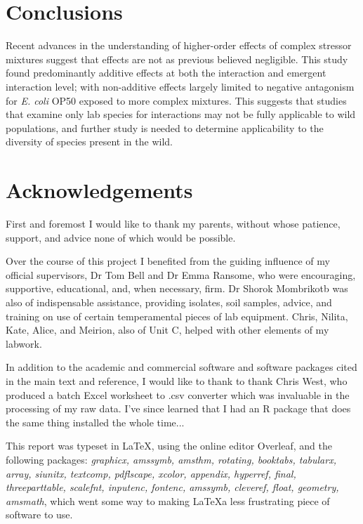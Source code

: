 \documentclass[final,1p,times]{elsarticle}
\begin{document}
\section{Conclusions}
\label{S:5}

Recent advances in the understanding of higher-order effects of complex stressor mixtures suggest that effects are not as previous believed negligible. This study found predominantly additive effects at both the interaction and emergent interaction level; with non-additive effects largely limited to negative antagonism for \textit{E. coli} OP50 exposed to more complex mixtures. This suggests that studies that examine only lab species for interactions may not be fully applicable to wild populations, and further study is needed to determine applicability to the diversity of species present in the wild.

\section{Acknowledgements}
\label{S:6}
First and foremost I would like to thank my parents, without whose patience, support, and advice none of which would be possible.

Over the course of this project I benefited from the guiding influence of my official supervisors, Dr Tom Bell and Dr Emma Ransome, who were encouraging, supportive, educational, and, when necessary, firm. Dr Shorok Mombrikotb was also of indispensable assistance, providing isolates, soil samples, advice, and training on use of certain temperamental pieces of lab equipment. Chris, Nilita, Kate, Alice, and Meirion, also of Unit C, helped with other elements of my labwork.

In addition to the academic and commercial software and software packages cited in the main text and reference, I would like to thank to thank Chris West, who produced a batch Excel worksheet to .csv converter which was invaluable in the processing of my raw data. I've since learned that I had an R package that does the same thing installed the whole time...

This report was typeset in \LaTeX, using the online editor Overleaf, and the following packages: \textit{graphicx, amssymb, amsthm, rotating, booktabs, tabularx, array, siunitx,  textcomp, pdflscape, xcolor,  appendix, hyperref, final, threeparttable, scalefnt, inputenc, fontenc, amssymb, cleveref, float, geometry, amsmath}, which went some way to making \LaTeX a less frustrating piece of software to use.   
\end{document}
